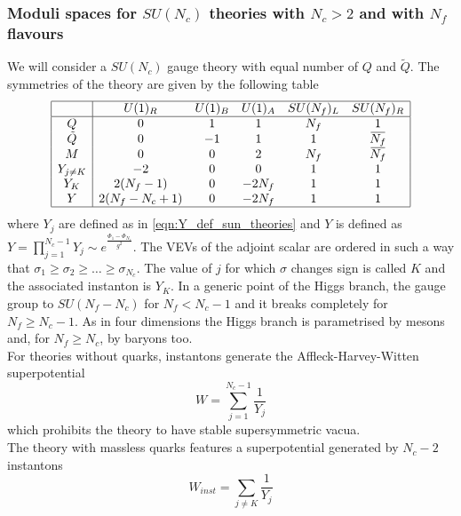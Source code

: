 \subsubsection{Moduli spaces for $SU(N_c)$ theories with $N_c >2 $ and with $N_f$ flavours }
We will consider a $SU(N_c)$ gauge theory with equal number of $Q$ and $\tilde{Q}$.
The symmetries of the theory are given by the following table
 \begin{equation}
\begin{array}{| c | c c c c c |}
\hline
  & U(1)_R & U(1)_B & U(1)_A & SU(N_f)_L & SU(N_f)_R \\
 \hline
 Q & 0 &1 & 1 & N_f & 1 \\  
 \tilde{Q}& 0 &-1 & 1 &1 & \overbar{N_f}  \\  
   M & 0 & 0 & 2 & N_f & \overbar{N_f}\\  
   Y_{j \neq K} & -2 & 0  & 0 &  1 & 1 \\
   Y_{K} & 2 (N_f -1 ) & 0 & - 2 N_f & 1 & 1 \\
   Y & 2 ( N_f -N_c +1) & 0 & - 2 N_f & 1 & 1 \\
   \hline
\end{array}
\end{equation}
where $Y_j$ are defined as in \eqref{eqn:Y_def_sun_theories} and $Y$ is defined as $Y = \prod_{j=1}^{N_c -1} Y_j \sim e^{ \frac{ \Phi_1 - \Phi_{N_c}  }{g^2}}$.
The VEVs of the adjoint scalar are ordered in such a way that $ \sigma_1 \geq \sigma_2 \geq \dotsc \geq \sigma_{N_c}$. 
The value of $j$ for which $\sigma$ changes sign is called $K$ and the associated instanton is $Y_K$.
In a generic point of the Higgs branch, the gauge group to $SU(N_f -N_c)$ for $N_f <N_c -1 $ and it breaks completely for $N_f \geq N_c - 1$. 
As in four dimensions the Higgs branch is parametrised by mesons and, for $N_f \geq N_c$, by baryons too.
\\
For theories without quarks, instantons generate the Affleck-Harvey-Witten \cite{Affleck:1982as} superpotential
\begin{equation}
W = \sum_{j=1}^{N_c - 1} \frac{1}{Y_j}
\label{eqn:def_AHW_Superpotential_Sun}
\end{equation}
which prohibits the theory to have stable supersymmetric vacua.\\
The theory with massless quarks features a superpotential generated by $N_c - 2$ instantons 
\begin{equation}
W_{inst} = \sum_{j \neq K} \frac{1}{Y_j}
\label{eqn:AHW_superpotential}
\end{equation}
